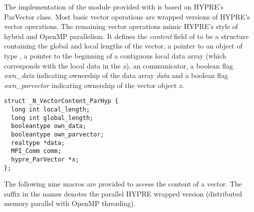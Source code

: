 %
The {\nvecph} implementation of the {\nvector} module provided with
{\sundials} is based on HYPRE's ParVector class. Most basic vector operations are 
wrapped versions of HYPRE's vector operations. The remaining vector operations 
mimic HYPRE's style of hybrid {\mpi} and OpenMP parallelism.  It defines the {\em content}
field of  to be a structure containing the global and local lengths 
of the vector, a pointer to an object of type , a pointer to the beginning of a contiguous local data array (which corresponds with the local data in the  {\em x}), an {\mpi} communicator, a boolean flag {\em own\_data} indicating ownership of the data array {\em data} and a boolean flag {\em own\_parvector} indicating ownership of the vector object {\em x}.
\begin{verbatim}
struct _N_VectorContent_ParHyp {
  long int local_length;
  long int global_length;
  booleantype own_data;
  booleantype own_parvector;
  realtype *data;
  MPI_Comm comm;
  hypre_ParVector *x;
};
\end{verbatim}
The following nine macros are provided to access the content of a {\nvecph}
vector. The suffix  in the names denotes the parallel HYPRE wrapped version (distributed memory parallel with OpenMP threading).

